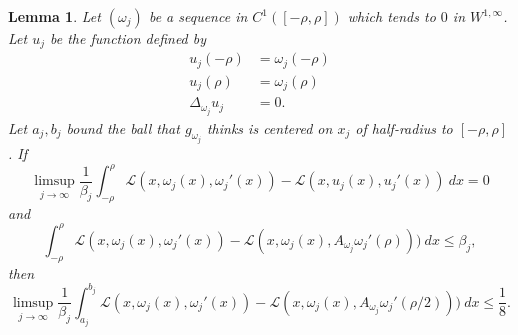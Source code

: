 \documentclass[reqno,12pt,letterpaper]{amsart}
\newtheorem{lemma}[theorem]{Lemma}
\theoremstyle{definition}
\numberwithin{equation}{section}
\begin{document}
\begin{lemma}
Let $(\omega_j)$ be a sequence in $C^1([-\rho, \rho])$ which tends to $0$ in $W^{1, \infty}$.
Let $u_j$ be the function defined by
\begin{align*}
u_j(-\rho) &= \omega_j(-\rho) \\
u_j(\rho) &= \omega_j(\rho) \\
\Delta_{\omega_j} u_j &= 0.
\end{align*}
Let $a_j,b_j$ bound the ball that $g_{\omega_j}$ thinks is centered on $x_j$ of half-radius to $[-\rho, \rho]$.
If
$$\limsup_{j \to \infty} \frac{1}{\beta_j} \int_{-\rho}^\rho \mathscr L(x, \omega_j(x), \omega_j'(x)) - \mathscr L(x, u_j(x), u_j'(x)) ~dx = 0$$
and
$$\int_{-\rho}^\rho \mathscr L(x, \omega_j(x), \omega_j'(x)) - \mathscr L(x, \omega_j(x), A_{\omega_j} \omega_j'(\rho))) ~dx \leq \beta_j,$$
then
$$\limsup_{j \to \infty} \frac{1}{\beta_j} \int_{a_j}^{b_j} \mathscr L(x, \omega_j(x), \omega_j'(x)) - \mathscr L(x, \omega_j(x), A_{\omega_j} \omega_j'(\rho/2))) ~dx \leq \frac{1}{8}.$$
\end{lemma}
\end{document}
